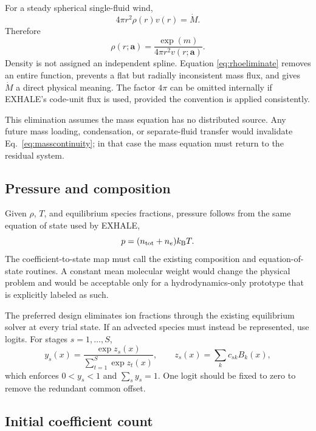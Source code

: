 \documentclass[english,a4paper]{my_memo}
\newcommand{\vect}[1]{\mathbf{#1}}
\newcommand{\coef}{\vect{a}}
\newcommand{\mdot}{\dot M}
\begin{document}
For a steady spherical single-fluid wind,
\begin{equation}
  4\pi r^2\rho(r)v(r)=\mdot.
  \label{eq:masscontinuity}
\end{equation}
Therefore
\begin{equation}
  \rho(r;\coef)=\frac{\exp(m)}{4\pi r^2v(r;\coef)}.
  \label{eq:rhoeliminate}
\end{equation}
Density is not assigned an independent spline.  Equation
\eqref{eq:rhoeliminate} removes an entire function, prevents a flat but
radially inconsistent mass flux, and gives \(\mdot\) a direct physical meaning.
The factor \(4\pi\) can be omitted internally if EXHALE's code-unit flux is used,
provided the convention is applied consistently.

This elimination assumes the mass equation has no distributed source.  Any
future mass loading, condensation, or separate-fluid transfer would invalidate
Eq.~\eqref{eq:masscontinuity}; in that case the mass equation must return to the
residual system.

\subsection{Pressure and composition}

Given \(\rho\), \(T\), and equilibrium species fractions, pressure follows from
the same equation of state used by EXHALE,
\begin{equation}
  p = (n_{\rm tot}+n_e)k_{\rm B}T.
  \label{eq:eos}
\end{equation}
The coefficient-to-state map must call the existing composition and equation-of-
state routines.  A constant mean molecular weight would change the physical
problem and would be acceptable only for a hydrodynamics-only prototype that is
explicitly labeled as such.

The preferred design eliminates ion fractions through the existing equilibrium
solver at every trial state.  If an advected species must instead be represented,
use logits.  For stages \(s=1,\ldots,S\),
\begin{equation}
 y_s(x)=\frac{\exp z_s(x)}{\sum_{t=1}^{S}\exp z_t(x)},
 \qquad z_s(x)=\sum_k c_{sk}B_k(x),
 \label{eq:softmax}
\end{equation}
which enforces \(0<y_s<1\) and \(\sum_sy_s=1\).  One logit should be fixed to
zero to remove the redundant common offset.

\subsection{Initial coefficient count}
\end{document}
